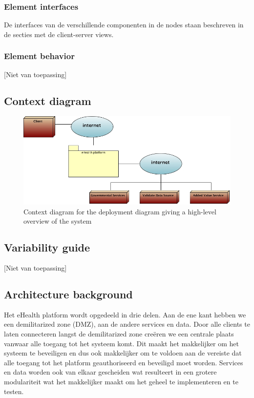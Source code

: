 \documentclass[a4paper,10pt]{article}
\begin{document}
\subsubsection{Element interfaces}

De interfaces van de verschillende componenten in de nodes staan beschreven in de secties met de client-server views.

\subsubsection{Element behavior}
[Niet van toepassing]

\clearpage
\subsection{Context diagram}

\begin{center}
    \begin{figure}[!h]
      \includegraphics[scale=0.60]{../images/deployment_DMZ_context.jpg}
	\caption{Context diagram for the deployment diagram giving a high-level overview of the system}
    \end{figure}
 \end{center}

\subsection{Variability guide}
[Niet van toepassing]

\subsection{Architecture background}

Het eHealth platform wordt opgedeeld in drie delen. Aan de ene kant hebben we een demilitarized zone (DMZ), aan de andere services en data. Door alle clients te laten connecteren langst de demilitarized zone creëren we een centrale plaats vanwaar alle toegang tot het systeem komt. Dit maakt het makkelijker om het systeem te beveiligen en dus ook makkelijker om te voldoen aan de vereiste dat alle toegang tot het platform geauthoriseerd en beveiligd moet worden. Services en data worden ook van elkaar gescheiden wat resulteert in een grotere modulariteit wat het makkelijker maakt om het geheel te implementeren en te testen.
\end{document}
